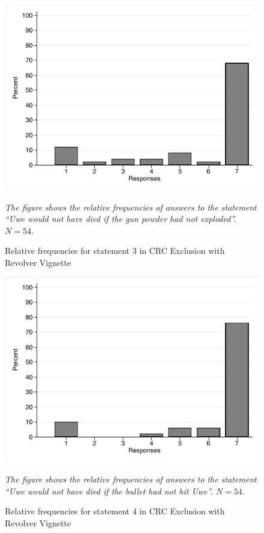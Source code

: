 \documentclass[egregdoesnotlikesansseriftitles,12pt]{scrartcl}
\begin{document}
\begin{figure}[H]
   \centering
   \includegraphics[scale=0.8]{figures/rev_crc_hist_3.pdf}
   \begin{minipage}{0.9\linewidth}
   \footnotesize
   \emph{The figure shows the relative frequencies of answers to the statement ``Uwe would not have died if the gun powder had not exploded''. $N=54$.}
   \end{minipage}
   \caption{Relative frequencies for statement 3 in CRC Exclusion with Revolver Vignette}
   \label{fig:rev_crc_hist_3}
\end{figure}

\begin{figure}[H]
   \centering
   \includegraphics[scale=0.8]{figures/rev_crc_hist_4.pdf}
   \begin{minipage}{0.9\linewidth}
   \footnotesize
   \emph{The figure shows the relative frequencies of answers to the statement ``Uwe would not have died if the bullet had not hit Uwe''. $N=54$.}
   \end{minipage}
   \caption{Relative frequencies for statement 4 in CRC Exclusion with Revolver Vignette}
   \label{fig:rev_crc_hist_4}
\end{figure}
\end{document}
